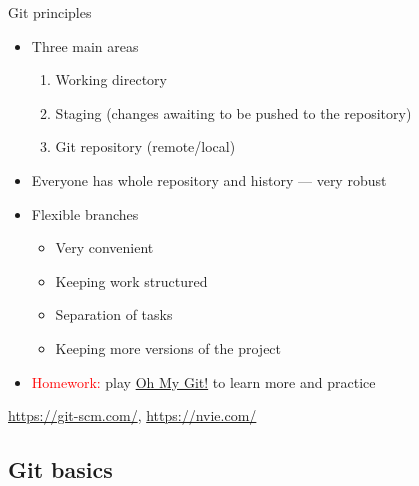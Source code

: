 \documentclass[compress, ucs, xelatex, 11pt, xcolor=svgnames, aspectratio=169,
	hyperref={
		bookmarks=true,
		unicode=true,
		colorlinks=true,
		pdftitle={Linux, command line and MetaCentrum},
		plainpages=false,
		pdfauthor={Vojtech Zeisek},
		pdfsubject={Course about use of Linux command line, writing shell scripts and using MetaCentrum of CESNET},
		pdfcreator={XeLaTeX},
		pdfkeywords={Linux, GNU, BASH, shell, command line, MetaCentrum},
		linkcolor=DarkRed, %
		anchorcolor=DarkBlue, %
		citecolor=Indigo, %
		filecolor=NavyBlue, %
		menucolor=DarkMagenta, %
		urlcolor=DarkBlue, %
		pdftex},
	url={hyphens, lowtilde} %
	]{beamer}
\renewcommand{\texttt}[1]{\colorbox{Beige}{{\ttfamily #1}}}
\renewcommand{\alert}[1]{\textcolor{red}{#1}}
\begin{document}
\begin{frame}[fragile]{Git principles}
	\begin{multicols}{2}
		\begin{itemize}
			\item Three main areas
			\begin{enumerate}
				\item Working directory
				\item Staging (changes awaiting to be pushed to the repository)
				\item Git repository (remote/local)
			\end{enumerate}
			\item Everyone has whole repository and history --- very robust
			\item Flexible branches
			\begin{itemize}
				\item Very convenient
				\item Keeping work structured
				\item Separation of tasks
				\item Keeping more versions of the project
			\end{itemize}
			\item \alert{Homework:} play \href{https://ohmygit.org/}{Oh My Git!} to learn more and practice
		\end{itemize}
		\begin{center}
			\texttt{[image: git.png]}
		\end{center}
		\begin{flushright}
			\begin{footnotesize}
				\href{https://git-scm.com/book/en/v2/Getting-Started-About-Version-Control}{https://git-scm.com/}, \href{https://nvie.com/posts/a-successful-git-branching-model/}{https://nvie.com/}
			\end{footnotesize}
		\end{flushright}
	\end{multicols}
\end{frame}

\subsection{Git basics}
\end{document}
